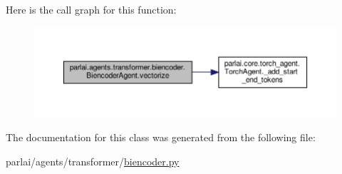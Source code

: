 Here is the call graph for this function\+:
\nopagebreak
\begin{figure}[H]
\begin{center}
\leavevmode
\includegraphics[width=350pt]{classparlai_1_1agents_1_1transformer_1_1biencoder_1_1BiencoderAgent_a0a75b68e9e6877358245f85bcb438d03_cgraph}
\end{center}
\end{figure}


The documentation for this class was generated from the following file\+:\begin{DoxyCompactItemize}
\item 
parlai/agents/transformer/\hyperlink{biencoder_8py}{biencoder.\+py}\end{DoxyCompactItemize}
